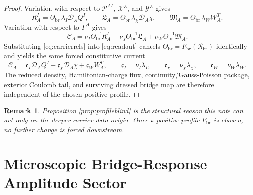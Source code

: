 \documentclass[11pt]{article}
\newcommand{\SpatialD}{\mathcal D}
\newcommand{\ConstCurrent}{\mathcal C}
\newcommand{\ConstGamma}{\Gamma}
\newcommand{\CurvQMult}{\mathscr P}
\newcommand{\CurvChiMult}{\mathscr X}
\newcommand{\CurvTransMult}{\mathscr Y}
\newcommand{\CurvSeed}{\Theta_{\mathrm{br}}}
\newcommand{\CurvProfile}{F_{\mathrm{br}}}
\newcommand{\CurvOneI}{\mathfrak K}
\newcommand{\CurvOneChi}{\mathfrak L}
\newcommand{\CurvOneW}{\mathfrak M}
\newcommand{\BridgeCurv}{\mathcal R_{\mathrm{br}}}
\newtheorem{remark}{Remark}
\begin{document}
\begin{proof}
Variation with respect to \(\CurvQMult^{AI}\), \(\CurvChiMult^A\), and \(\CurvTransMult^A\) gives
\begin{equation}
\CurvOneI_A^I=\CurvSeed\,\lambda_I\SpatialD_AQ^I,
\qquad
\CurvOneChi_A=\CurvSeed\,\lambda_\chi\SpatialD_A\chi,
\qquad
\CurvOneW_A=\CurvSeed\,\lambda_WW_A^T.
\label{eq:carrierrels}
\end{equation}
Variation with respect to \(\ConstGamma^A\) gives
\begin{equation}
\ConstCurrent_A
=
\nu_I\CurvSeed^{-1}\CurvOneI_A^I
+\nu_\chi\CurvSeed^{-1}\CurvOneChi_A
+\nu_W\CurvSeed^{-1}\CurvOneW_A.
\label{eq:readout}
\end{equation}
Substituting \eqref{eq:carrierrels} into \eqref{eq:readout} cancels \(\CurvSeed=\CurvProfile(\BridgeCurv)\) identically and yields the same forced constitutive current
\begin{equation}
\ConstCurrent_A
=
\mathfrak c_I\SpatialD_AQ^I
+\mathfrak c_\chi\SpatialD_A\chi
+\mathfrak c_WW_A^T,
\qquad
\mathfrak c_I=\nu_I\lambda_I,
\qquad
\mathfrak c_\chi=\nu_\chi\lambda_\chi,
\qquad
\mathfrak c_W=\nu_W\lambda_W.
\label{eq:forcedcurrent}
\end{equation}
The reduced density, Hamiltonian-charge flux, continuity/Gauss-Poisson package, exterior Coulomb tail, and surviving dressed bridge map are therefore independent of the chosen positive profile.
\end{proof}

\begin{remark}
Proposition \ref{prop:profileblind} is the structural reason this note can act only on the deeper carrier-data origin. Once a positive profile \(\CurvProfile\) is chosen, no further change is forced downstream.
\end{remark}

\section{Microscopic Bridge-Response Amplitude Sector}
\end{document}
